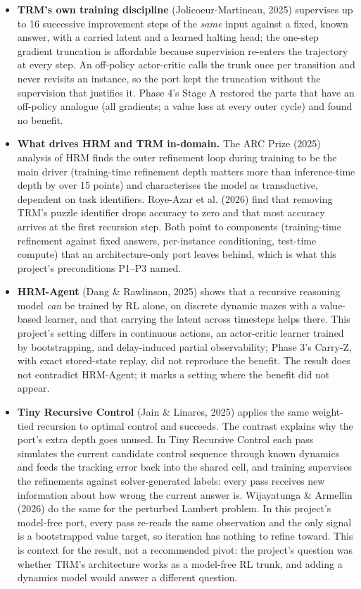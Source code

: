 \documentclass[11pt]{article}
\begin{document}
\begin{itemize}
\item \textbf{TRM's own training discipline} (Jolicoeur-Martineau, 2025) supervises up to 16 successive improvement steps of the \emph{same} input against a fixed, known answer, with a carried latent and a learned halting head; the one-step gradient truncation is affordable because supervision re-enters the trajectory at every step. An off-policy actor-critic calls the trunk once per transition and never revisits an instance, so the port kept the truncation without the supervision that justifies it. Phase 4's Stage A restored the parts that have an off-policy analogue (all gradients; a value loss at every outer cycle) and found no benefit.
\item \textbf{What drives HRM and TRM in-domain.} The ARC Prize (2025) analysis of HRM finds the outer refinement loop during training to be the main driver (training-time refinement depth matters more than inference-time depth by over 15 points) and characterises the model as transductive, dependent on task identifiers. Roye-Azar et al. (2026) find that removing TRM's puzzle identifier drops accuracy to zero and that most accuracy arrives at the first recursion step. Both point to components (training-time refinement against fixed answers, per-instance conditioning, test-time compute) that an architecture-only port leaves behind, which is what this project's preconditions P1--P3 named.
\item \textbf{HRM-Agent} (Dang \& Rawlinson, 2025) shows that a recursive reasoning model \emph{can} be trained by RL alone, on discrete dynamic mazes with a value-based learner, and that carrying the latent across timesteps helps there. This project's setting differs in continuous actions, an actor-critic learner trained by bootstrapping, and delay-induced partial observability; Phase 3's Carry-Z, with exact stored-state replay, did not reproduce the benefit. The result does not contradict HRM-Agent; it marks a setting where the benefit did not appear.
\item \textbf{Tiny Recursive Control} (Jain \& Linares, 2025) applies the same weight-tied recursion to optimal control and succeeds. The contrast explains why the port's extra depth goes unused. In Tiny Recursive Control each pass simulates the current candidate control sequence through known dynamics and feeds the tracking error back into the shared cell, and training supervises the refinements against solver-generated labels: every pass receives new information about how wrong the current answer is. Wijayatunga \& Armellin (2026) do the same for the perturbed Lambert problem. In this project's model-free port, every pass re-reads the same observation and the only signal is a bootstrapped value target, so iteration has nothing to refine toward. This is context for the result, not a recommended pivot: the project's question was whether TRM's architecture works as a model-free RL trunk, and adding a dynamics model would answer a different question.

\end{itemize}
\end{document}
